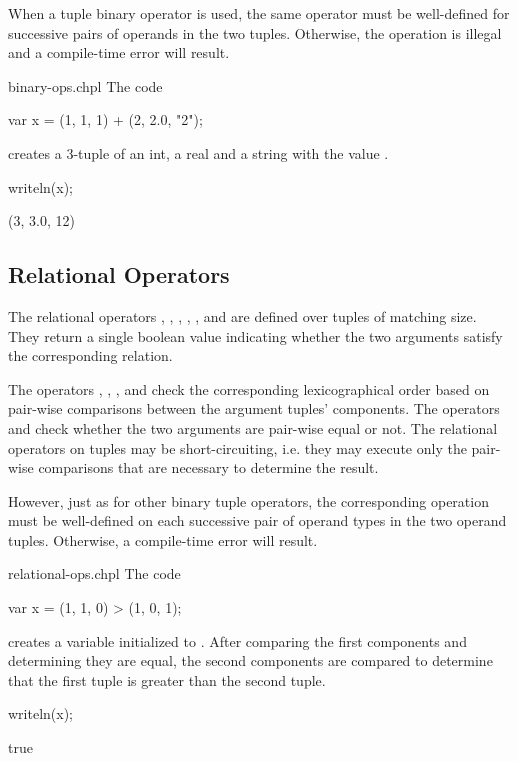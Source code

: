 When a tuple binary operator is used, the same operator must be
well-defined for successive pairs of operands in the two tuples.
Otherwise, the operation is illegal and a compile-time error will
result.

\begin{chapelexample}{binary-ops.chpl}
The code
\begin{chapel}
var x = (1, 1, 1) + (2, 2.0, "2");
\end{chapel}
creates a 3-tuple of an int, a real and a string with the value .
\begin{chapelpost}
writeln(x);
\end{chapelpost}
\begin{chapeloutput}
(3, 3.0, 12)
\end{chapeloutput}
\end{chapelexample}


\subsection{Relational Operators}
\label{Tuple_Relational_Operators}


The relational operators \chpl{\>}, \chpl{\>\=}, \chpl{\<}, \chpl{\<\=},
\chpl{\=\=}, and \chpl{\!\=} are defined over tuples of matching size.
They return a single boolean value indicating whether the two
arguments satisfy the corresponding relation.

The operators \chpl{\>}, \chpl{\>\=}, \chpl{\<}, and \chpl{\<\=}
check the corresponding lexicographical order
based on pair-wise comparisons between the argument tuples' components.
The operators \chpl{\=\=} and \chpl{\!\=} check whether
the two arguments are pair-wise equal or not.
The relational operators on tuples may be short-circuiting, i.e.
they may execute only the pair-wise comparisons that are necessary
to determine the result.

However, just as for other binary tuple operators, the corresponding operation
must be well-defined on each successive pair of operand types in the two operand
tuples.  Otherwise, a compile-time error will result.

\begin{chapelexample}{relational-ops.chpl}
The code
\begin{chapel}
var x = (1, 1, 0) > (1, 0, 1);
\end{chapel}
creates a variable initialized to .  After comparing the
first components and determining they are equal, the second components
are compared to determine that the first tuple is greater than the
second tuple.
\begin{chapelpost}
writeln(x);
\end{chapelpost}
\begin{chapeloutput}
true
\end{chapeloutput}
\end{chapelexample}

